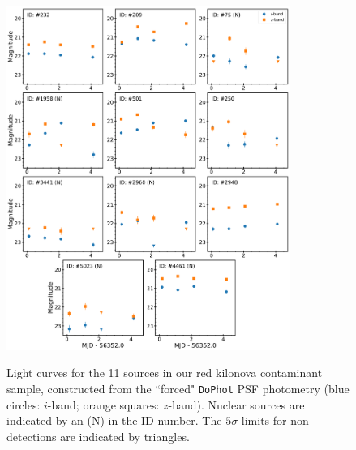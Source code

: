 \begin{figure}[!t]
\begin{center}
\hspace*{-0.1in}
\scalebox{1.}
{\includegraphics[width=0.825\textwidth]{./figs/chapter3/f4.pdf}}
\caption{Light curves for the 11 sources in our red kilonova contaminant sample, constructed from the ``forced" {\tt DoPhot} PSF photometry (blue circles: $i$-band; orange squares: $z$-band). Nuclear sources are indicated by an (N) in the ID number. The $5\sigma$ limits for non-detections are indicated by triangles.}
\label{fig:ch3_final_lc_red}
\end{center}
\vspace{0.5cm}
\end{figure}


